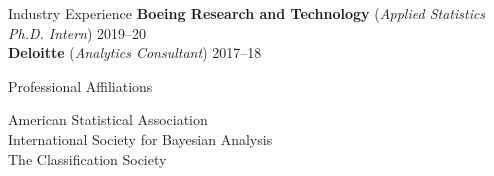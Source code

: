 \documentclass{resume} %
\begin{document}
\begin{rSection}{Industry Experience}
\textbf{Boeing Research and Technology} (\textit{Applied Statistics Ph.D. Intern}) \hfill{2019--20}
\\ \textbf{Deloitte} (\textit{Analytics Consultant}) \hfill{2017--18}

\end{rSection}

\begin{rSection}{Professional Affiliations}

American Statistical Association
\\ International Society for Bayesian Analysis
\\ The Classification Society

\end{rSection}
\end{document}
